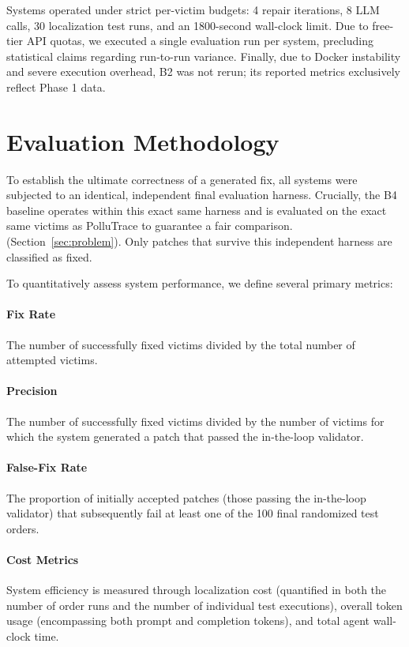 \documentclass[conference]{IEEEtran}
\begin{document}
Systems operated under strict per-victim budgets: 4 repair iterations, 8 LLM calls, 30 localization test runs, and an 1800-second wall-clock limit. Due to free-tier API quotas, we executed a single evaluation run per system, precluding statistical claims regarding run-to-run variance. Finally, due to Docker instability and severe execution overhead, B2 was not rerun; its reported metrics exclusively reflect Phase 1 data.
\section{Evaluation Methodology}
\label{sec:evalmethod}
To establish the ultimate correctness of a generated fix, all systems were subjected to an identical, independent final evaluation harness. Crucially, the B4 baseline operates within this exact same harness and is evaluated on the exact same victims as PolluTrace to guarantee a fair comparison. (Section~\ref{sec:problem}). Only patches that survive this independent harness are classified as fixed.

To quantitatively assess system performance, we define several primary metrics:

\paragraph{Fix Rate} The number of successfully fixed victims divided by the total number of attempted victims.

\paragraph{Precision} The number of successfully fixed victims divided by the number of victims for which the system generated a patch that passed the in-the-loop validator.

\paragraph{False-Fix Rate} The proportion of initially accepted patches (those passing the in-the-loop validator) that subsequently fail at least one of the 100 final randomized test orders.

\paragraph{Cost Metrics} System efficiency is measured through localization cost (quantified in both the number of order runs and the number of individual test executions), overall token usage (encompassing both prompt and completion tokens), and total agent wall-clock time.
\end{document}
